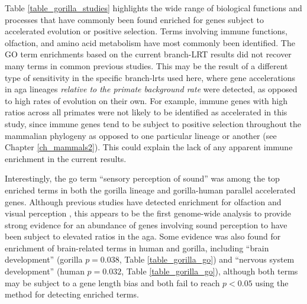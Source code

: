 Table \ref{table_gorilla_studies} highlights the wide range of
biological functions and processes that have commonly been found
enriched for genes subject to accelerated evolution or positive
selection. Terms involving immune functions, olfaction, and amino acid
metabolism have most commonly been identified. The GO term enrichments
based on the current branch-LRT results did not recover many terms in
common previous studies. This may be the result of a different type of
sensitivity in the specific branch-\acp{lrt} used here, where gene
accelerations in \ac{aga} lineages \emph{relative to the primate
  background rate} were detected, as opposed to high rates of
evolution on their own. For example, immune genes with high \dnds
ratios across all primates were not likely to be identified as
accelerated in this study, since immune genes tend to be subject to
positive selection throughout the mammalian phylogeny as opposed to
one particular lineage or another (see Chapter
\ref{ch_mammals2}). This could explain the lack of any apparent immune
enrichment in the current results.

Interestingly, the \ac{go} term ``sensory perception of sound'' was
among the top enriched terms in both the gorilla lineage and
gorilla-human parallel accelerated genes. Although previous studies
have detected enrichment for olfaction and visual perception
\citep{Clark2003,Nielsen2005,Macaque2007}, this appears to be the
first genome-wide analysis to provide strong evidence for an abundance
of genes involving sound perception to have been subject to elevated
\dnds ratios in the \ac{aga}. Some evidence was also found for
enrichment of brain-related terms in human and gorilla, including
``brain development'' (gorilla $p=0.038$, Table
\ref{table_gorilla_go}) and ``nervous system development'' (human
$p=0.032$, Table \ref{table_gorilla_go}), although both terms may be
subject to a gene length bias and both fail to reach $p<0.05$ using the
\goseq method for detecting enriched terms.

